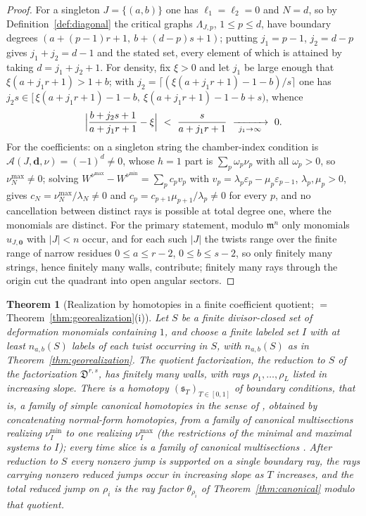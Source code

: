 \documentclass[11pt]{amsart}
\newtheorem{theorem}{Theorem}[section]
\theoremstyle{definition}
\theoremstyle{remark}
\newcommand{\Dscr}{\mathfrak{D}}
\newcommand{\Ascr}{\mathcal{A}}
\begin{document}
\begin{proof}
For a singleton $J=\{(a,b)\}$ one has $\ell_{1}=\ell_{2}=0$ and $N=d$, so by
Definition~\ref{def:diagonal} the critical graphs $\Lambda_{J,p}$, $1\le p\le d$,
have boundary degrees $(a+(p-1)r+1,\ b+(d-p)s+1)$; putting $j_1=p-1$,
$j_2=d-p$ gives $j_1+j_2=d-1$ and the stated set, every element of which is
attained by taking $d=j_1+j_2+1$. For density, fix $\xi>0$ and let $j_1$
be large enough that $\xi(a+j_1r+1)>1+b$; with
$j_2=\lceil (\xi(a+j_1r+1)-1-b)/s\rceil$ one has
$j_2 s\in[\,\xi(a+j_1r+1)-1-b,\ \xi(a+j_1r+1)-1-b+s)$, whence
\[
\Bigl|\frac{b+j_2 s+1}{a+j_1r+1}-\xi\Bigr|\ <\ \frac{s}{a+j_1r+1}\
\xrightarrow[\ j_1\to\infty\ ]{}\ 0 .
\]
For the coefficients: on a singleton string the chamber-index
condition is $\Ascr(J,\mathbf d,\nu)=(-1)^{d}\ne0$, whose $h=1$ part is
$\sum_{p}\omega_{p}\nu_{p}$ with all $\omega_{p}>0$, so $\nu^{\max}_{N}\ne0$;
solving $W^{\nu^{\max}}-W^{\nu^{\min}}=\sum_{p}c_{p}v_{p}$ with
$v_{p}=\lambda_{p}\varepsilon_{p}-\mu_{p}\varepsilon_{p-1}$, $\lambda_{p},\mu_{p}>0$, gives
$c_{N}=\nu^{\max}_{N}/\lambda_{N}\ne0$ and $c_{p}=c_{p+1}\mu_{p+1}/\lambda_{p}\ne0$ for every
$p$, and no cancellation between distinct rays is possible at total degree one,
where the monomials are distinct.
For the primary statement, modulo $\mathfrak m^{n}$ only monomials
$u_{J,\mathbf 0}$ with $|J|<n$ occur, and for each such $|J|$ the twists range
over the finite range of narrow residues $0\le a\le r-2$, $0\le b\le s-2$, so
only finitely many strings, hence
finitely many walls, contribute; finitely many rays through the origin cut the
quadrant into open angular sectors.
\end{proof}

\begin{theorem}[Realization by homotopies in a finite coefficient quotient;
  $=$ Theorem~\ref{thm:georealization}(i)]
\label{conj:geometric}
Let $S$ be a finite divisor-closed set of deformation monomials containing
$1$, and choose a finite labeled set $I$ with at least $n_{a,b}(S)$ labels of
each twist occurring in $S$, with $n_{a,b}(S)$ as in
Theorem~\ref{thm:georealization}.  The quotient factorization, the reduction to
$S$ of the factorization $\Dscr^{r,s}$, has finitely many walls, with rays
$\rho_1,\dots,\rho_L$ listed in increasing slope.  There is a homotopy
$(\mathfrak s_{T})_{T\in[0,1]}$ of boundary conditions, that is, a family of
simple canonical homotopies in the sense of \cite[Defs.~3.36--3.37]{GKT},
obtained by concatenating normal-form homotopies, from a family of canonical multisections realizing $\nu_I^{\min}$ to
one realizing $\nu_I^{\max}$ (the restrictions of the minimal and maximal
systems to $I$); every time slice is a family of canonical multisections
\cite[Def.~3.22]{GKT}.  After reduction to $S$ every
nonzero jump is supported on a single boundary ray, the rays carrying nonzero
reduced jumps occur in increasing slope as $T$ increases, and the total
reduced jump on $\rho_{i}$
is the ray factor $\theta_{\rho_{i}}$ of
Theorem~\ref{thm:canonical} modulo that quotient.
\end{theorem}
\end{document}
